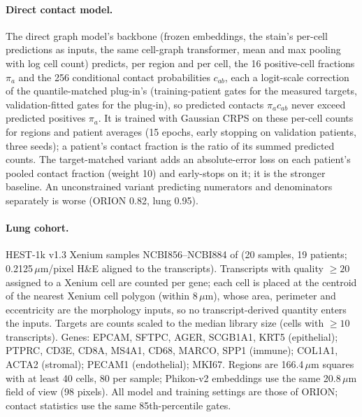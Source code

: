 \documentclass[10pt,letterpaper]{article}
\theoremstyle{definition}
\theoremstyle{remark}
\begin{document}
\paragraph{Direct contact model.} The direct graph model's backbone (frozen embeddings, the stain's per-cell predictions as inputs, the same cell-graph transformer, mean and max pooling with log cell count) predicts, per region and per cell, the 16 positive-cell fractions $\pi_a$ and the 256 conditional contact probabilities $c_{ab}$, each a logit-scale correction of the quantile-matched plug-in's (training-patient gates for the measured targets, validation-fitted gates for the plug-in), so predicted contacts $\pi_ac_{ab}$ never exceed predicted positives $\pi_a$. It is trained with Gaussian CRPS on these per-cell counts for regions and patient averages (15 epochs, early stopping on validation patients, three seeds); a patient's contact fraction is the ratio of its summed predicted counts. The target-matched variant adds an absolute-error loss on each patient's pooled contact fraction (weight 10) and early-stops on it; it is the stronger baseline. An unconstrained variant predicting numerators and denominators separately is worse (ORION 0.82, lung 0.95).
\paragraph{Lung cohort.} HEST-1k v1.3 Xenium samples NCBI856--NCBI884 of \citet{vannan2025} (20 samples, 19 patients; 0.2125\,$\mu$m/pixel H\&E aligned to the transcripts). Transcripts with quality $\ge20$ assigned to a Xenium cell are counted per gene; each cell is placed at the centroid of the nearest Xenium cell polygon (within 8\,$\mu$m), whose area, perimeter and eccentricity are the morphology inputs, so no transcript-derived quantity enters the inputs. Targets are counts scaled to the median library size (cells with $\ge10$ transcripts). Genes: EPCAM, SFTPC, AGER, SCGB1A1, KRT5 (epithelial); PTPRC, CD3E, CD8A, MS4A1, CD68, MARCO, SPP1 (immune); COL1A1, ACTA2 (stromal); PECAM1 (endothelial); MKI67. Regions are 166.4\,$\mu$m squares with at least 40 cells, 80 per sample; Phikon-v2 embeddings use the same 20.8\,$\mu$m field of view (98 pixels). All model and training settings are those of ORION; contact statistics use the same 85th-percentile gates.
\end{document}
